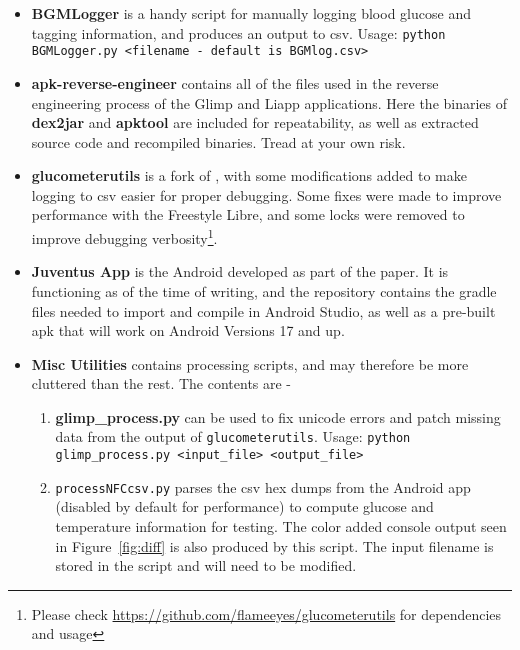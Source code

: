 \begin{itemize}

\item \textbf{BGMLogger} is a handy script for manually logging blood glucose and tagging information, and produces an output to csv. Usage: \texttt{python BGMLogger.py <filename - default is BGMlog.csv>}

\item \textbf{apk-reverse-engineer} contains all of the files used in the reverse engineering process of the Glimp and Liapp applications. Here the binaries of \textbf{dex2jar} and \textbf{apktool} are included for repeatability, as well as extracted source code and recompiled binaries. Tread at your own risk.

\item \textbf{glucometerutils} is a fork of \cite{petteno_glucometerutils:_2018}, with some modifications added to make logging to csv easier for proper debugging. Some fixes were made to improve performance with the Freestyle Libre, and some locks were removed to improve debugging verbosity\footnote{Please check \url{https://github.com/flameeyes/glucometerutils} for dependencies and usage}. 

\item \textbf{Juventus App} is the Android developed as part of the paper. It is functioning as of the time of writing, and the repository contains the gradle files needed to import and compile in Android Studio, as well as a pre-built apk that will work on Android Versions 17 and up.

\item \textbf{Misc Utilities} contains processing scripts, and may therefore be more cluttered than the rest. The contents are - 

\begin{enumerate}

\item \textbf{glimp\_process.py} can be used to fix unicode errors and patch missing data from the output of \texttt{glucometerutils}. Usage: \texttt{python glimp\_process.py <input\_file> <output\_file>}

\item \texttt{processNFCcsv.py} parses the csv hex dumps from the Android app (disabled by default for performance) to compute glucose and temperature information for testing. The color added console output seen in Figure~\ref{fig:diff} is also produced by this script. The input filename is stored in the script and will need to be modified.


\end{enumerate}
\end{itemize}

